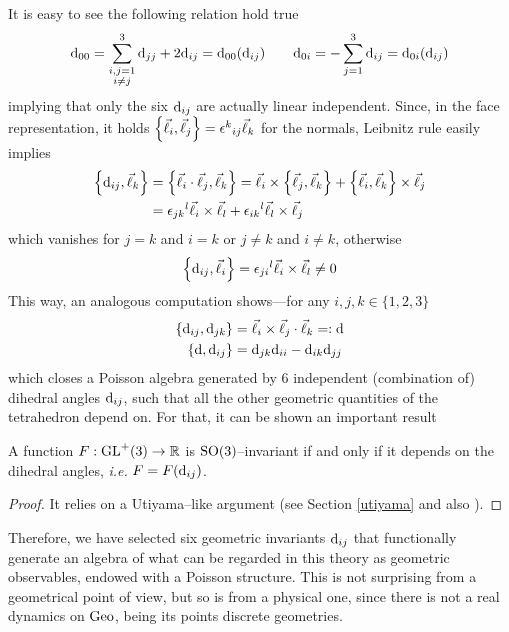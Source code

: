 It is easy to see the following relation hold true
$$\text{\normalfont d}_{00}=\sum_{\substack{i,j=1\\ i\neq j}}^3\text{\normalfont d}_{jj}+2\text{\normalfont d}_{ij}=\text{\normalfont d}_{00}(\text{\normalfont d}_{ij})\qquad\text{\normalfont d}_{0i}=-\sum_{j=1}^3\text{\normalfont d}_{ij}=\text{\normalfont d}_{0i}(\text{\normalfont d}_{ij})$$ 
implying that only the six $\text{\normalfont d}_{ij}$ are actually linear independent. Since, in the face representation, it holds $\left\{\vec{\ell}_i,\vec{\ell}_j\right\}={\epsilon^k}_{ij}\vec{\ell}_k$ for the normals, Leibnitz rule easily implies
\begin{align*}
    \left\{\text{\normalfont d}_{ij},\vec{\ell}_k\right\}&=\left\{\vec{\ell}_i\cdot\vec{\ell}_j,\vec{\ell}_k\right\}=\vec{\ell}_i\times\left\{\vec{\ell}_j,\vec{\ell}_k\right\}+\left\{\vec{\ell}_i,\vec{\ell}_k\right\}\times\vec{\ell}_j\\
    &={\epsilon_{jk}}^l\vec{\ell}_i\times\vec{\ell}_l+{\epsilon_{ik}}^l\vec{\ell}_l\times\vec{\ell}_j
\end{align*}
{which vanishes for $j=k$ and $i=k$ or $j\neq k$ and $i\neq k$, otherwise 
$$\left\{\text{\normalfont d}_{ij},\vec{\ell}_i\right\}={\epsilon_{ji}}^l\vec{\ell}_i\times\vec{\ell}_l\neq0$$}
This way, an analogous computation shows---for any $i,j,k\in\{1,2,3\}$
\begin{equation}\label{classical_geom_obs}
\begin{split}
    \left\{\text{\normalfont d}_{ij},\text{\normalfont d}_{jk}\right\}&=\vec{\ell}_i\times\vec{\ell}_j\cdot\vec{\ell}_k=:\text{\normalfont d}\\
    \{\text{\normalfont d},\text{\normalfont d}_{ij}\}&=\text{\normalfont d}_{jk}\text{\normalfont d}_{ii}-\text{\normalfont d}_{ik}\text{\normalfont d}_{jj}
\end{split}
\end{equation}
{which closes a Poisson algebra generated by $6$ independent (combination of) dihedral angles $\text{\normalfont d}_{ij}$, such that all the other geometric quantities of the tetrahedron depend on.} For that, it can be shown an important result
\,\newline
\begin{teo}\label{T^*Geo}
    A function $F:\text{\normalfont GL}^+(3)\to\mathbb{R}$ is $\text{\normalfont SO}(3)$--invariant if and only if it depends on the dihedral angles, \emph{i.e.} $F=F(\text{\normalfont d}_{ij})$.
\end{teo}
\begin{proof}
    It relies on a Utiyama--like argument (see Section \ref{utiyama} and also \cite{LN9}).
\end{proof}
Therefore, we have selected six geometric invariants $\text{\normalfont d}_{ij}$ that functionally generate an algebra of what can be regarded in this theory as geometric observables, endowed with a Poisson structure.
This is not surprising from a geometrical point of view, but so is from a physical one, since there is not a real dynamics on $\text{\normalfont Geo}$, being its points discrete geometries.

